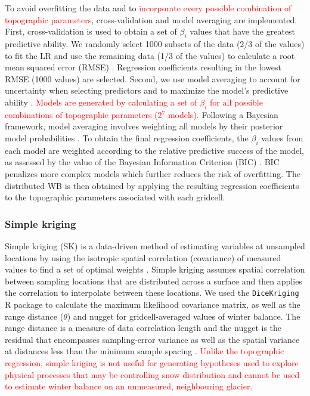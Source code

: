 \documentclass[review,oneside, letterpaper]{igs}
\begin{document}
To avoid overfitting the data and to \textcolor{red}{ incorporate every possible combination of topographic parameters}, cross-validation and model averaging are implemented. First, cross-validation is used to obtain a set of $\beta_i$ values that have the greatest predictive ability. We randomly select 1000 subsets of the data (2/3 of the values) to fit the LR and use the remaining data (1/3 of the values) to calculate a root mean squared error (RMSE) \citep{Kohavi1995}. Regression coefficients resulting in the lowest RMSE (1000 values) are selected. Second, we use model averaging to account for uncertainty when selecting predictors and to maximize the model's predictive ability \citep{Madigan1994}.  \textcolor{red}{Models are generated by calculating a set of $\beta_i$ for all possible combinations of topographic parameters (2$^7$ models).} Following a Bayesian framework, model averaging involves weighting all models by their posterior model probabilities \citep{Raftery1997}. To obtain the final regression coefficients, the $\beta_i$ values from each model are weighted according to the relative predictive success of the model, as assessed by the value of the Bayesian Information Criterion (BIC) \citep{Burnham2004}. BIC penalizes more complex models which further reduces the risk of overfitting. The distributed WB is then obtained by applying the resulting regression coefficients to the topographic parameters associated with each gridcell. 

\subsubsection{Simple kriging}

Simple kriging (SK) is a data-driven method of estimating variables at unsampled locations by using the isotropic spatial correlation (covariance) of measured values to find a set of optimal weights \citep{Davis1986, Li2008}. Simple kriging assumes spatial correlation between sampling locations that are distributed across a surface and then applies the correlation to interpolate between these locations. We used the \texttt{DiceKriging} R package \citep{Roustant2012} to calculate the maximum likelihood covariance matrix, as well as the range distance ($\theta$) and nugget for gridcell-averaged values of winter balance. The range distance is a measure of data correlation length and the nugget is the residual that encompasses sampling-error variance as well as the spatial variance at distances less than the minimum sample spacing \citep{Li2008}. \textcolor{red}{Unlike the topographic regression, simple kriging is not useful for generating hypotheses used to explore physical processes that may be controlling snow distribution and cannot be used to estimate winter balance on an unmeasured, neighbouring glacier.} 
\end{document}
